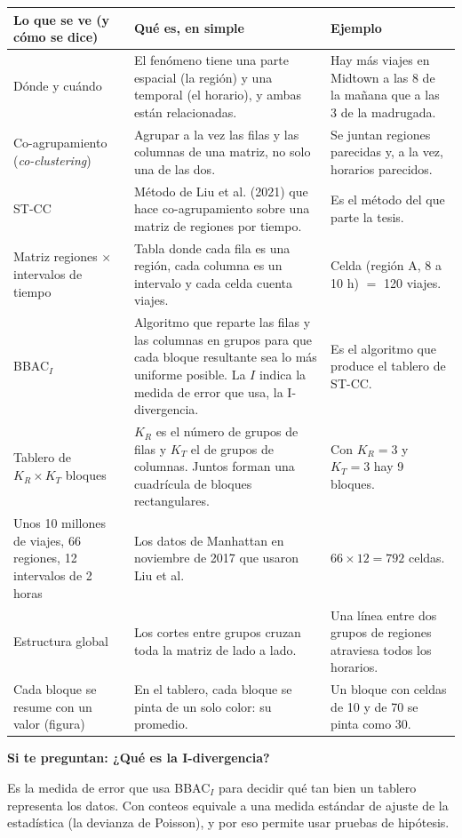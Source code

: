 \documentclass[11pt,a4paper]{article}
\makeatletter
\newcommand{\cajainicio}[3]{\def\cajafc{#1}\def\cajabc{#2}\par\medskip\noindent
  \begin{lrbox}{\cajabox}\begin{minipage}{\dimexpr\linewidth-2\fboxsep-2\fboxrule\relax}%
  \small\textbf{\color{#1}#3}\par\smallskip}
\newcommand{\cajafin}{\end{minipage}\end{lrbox}\fcolorbox{\cajafc}{\cajabc}{\usebox{\cajabox}}\par\medskip}
\newenvironment{preg}[1]{\cajainicio{acc}{acc!7}{Si te preguntan: #1}}{\cajafin}
\newenvironment{partes}{%
  \begin{longtable}{@{}>{\raggedright\arraybackslash}p{4.3cm}>{\raggedright\arraybackslash}p{6.0cm}>{\raggedright\arraybackslash}p{5.0cm}@{}}
  \toprule \textbf{Lo que se ve (y cómo se dice)} & \textbf{Qué es, en simple} & \textbf{Ejemplo}\\ \midrule \endhead}{%
  \bottomrule\end{longtable}}
\newcommand{\se}[1]{\newline{\small\color{ucspblue}(se dice «#1»)}}
\makeatother
\begin{document}
\begin{partes}
Dónde y cuándo & El fenómeno tiene una parte espacial (la región) y una temporal (el horario), y ambas están relacionadas. & Hay más viajes en Midtown a las 8 de la mañana que a las 3 de la madrugada. \\
Co-agrupamiento (\emph{co-clustering}) \se{co-agrupamiento} & Agrupar a la vez las filas y las columnas de una matriz, no solo una de las dos. & Se juntan regiones parecidas y, a la vez, horarios parecidos. \\
ST-CC \se{ese te, ce ce} & Método de Liu et al. (2021) que hace co-agrupamiento sobre una matriz de regiones por tiempo. & Es el método del que parte la tesis. \\
Matriz regiones $\times$ intervalos de tiempo \se{matriz de regiones por intervalos de tiempo} & Tabla donde cada fila es una región, cada columna es un intervalo y cada celda cuenta viajes. & Celda (región A, 8 a 10 h) $=$ 120 viajes. \\
BBAC$_I$ \se{be be a ce, sub i} & Algoritmo que reparte las filas y las columnas en grupos para que cada bloque resultante sea lo más uniforme posible. La $I$ indica la medida de error que usa, la I-divergencia. & Es el algoritmo que produce el tablero de ST-CC. \\
Tablero de $K_R\times K_T$ bloques \se{K sub R por K sub T} & $K_R$ es el número de grupos de filas y $K_T$ el de grupos de columnas. Juntos forman una cuadrícula de bloques rectangulares. & Con $K_R=3$ y $K_T=3$ hay 9 bloques. \\
Unos 10 millones de viajes, 66 regiones, 12 intervalos de 2 horas & Los datos de Manhattan en noviembre de 2017 que usaron Liu et al. & $66\times12=792$ celdas. \\
Estructura global & Los cortes entre grupos cruzan toda la matriz de lado a lado. & Una línea entre dos grupos de regiones atraviesa todos los horarios. \\
Cada bloque se resume con un valor (figura) & En el tablero, cada bloque se pinta de un solo color: su promedio. & Un bloque con celdas de 10 y de 70 se pinta como 30. \\
\end{partes}

\begin{preg}{¿Qué es la I-divergencia?}
Es la medida de error que usa BBAC$_I$ para decidir qué tan bien un tablero representa los datos. Con conteos equivale a una medida estándar de ajuste de la estadística (la devianza de Poisson), y por eso permite usar pruebas de hipótesis.
\end{preg}
\end{document}
